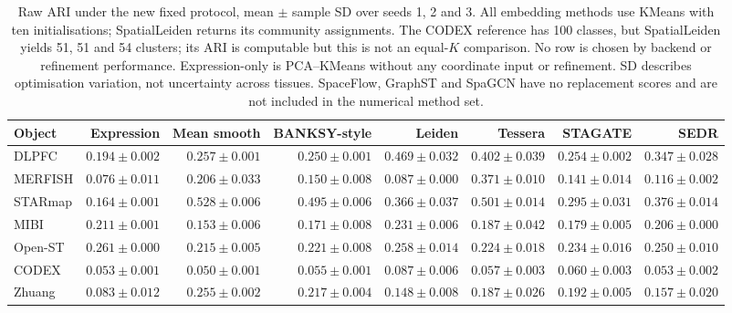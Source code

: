 \begin{table}[!htbp]\centering\footnotesize

\caption{Raw ARI under the new fixed protocol, mean $\pm$ sample SD over seeds 1, 2 and 3. All embedding methods use KMeans with ten initialisations; SpatialLeiden returns its community assignments. The CODEX reference has 100 classes, but SpatialLeiden yields 51, 51 and 54 clusters; its ARI is computable but this is not an equal-$K$ comparison. No row is chosen by backend or refinement performance. Expression-only is PCA--KMeans without any coordinate input or refinement. SD describes optimisation variation, not uncertainty across tissues. SpaceFlow, GraphST and SpaGCN have no replacement scores and are not included in the numerical method set.}

\label{tab:field-ari}

\setlength{\tabcolsep}{3.2pt}\begin{tabular}{lrrrrrrr}\toprule

Object & Expression & Mean smooth & BANKSY-style & Leiden & Tessera & STAGATE & SEDR\\\midrule

DLPFC & $0.194\pm0.002$ & $0.257\pm0.001$ & $0.250\pm0.001$ & $0.469\pm0.032$ & $0.402\pm0.039$ & $0.254\pm0.002$ & $0.347\pm0.028$\\

MERFISH & $0.076\pm0.011$ & $0.206\pm0.033$ & $0.150\pm0.008$ & $0.087\pm0.000$ & $0.371\pm0.010$ & $0.141\pm0.014$ & $0.116\pm0.002$\\

STARmap & $0.164\pm0.001$ & $0.528\pm0.006$ & $0.495\pm0.006$ & $0.366\pm0.037$ & $0.501\pm0.014$ & $0.295\pm0.031$ & $0.376\pm0.014$\\

MIBI & $0.211\pm0.001$ & $0.153\pm0.006$ & $0.171\pm0.008$ & $0.231\pm0.006$ & $0.187\pm0.042$ & $0.179\pm0.005$ & $0.206\pm0.000$\\

Open-ST & $0.261\pm0.000$ & $0.215\pm0.005$ & $0.221\pm0.008$ & $0.258\pm0.014$ & $0.224\pm0.018$ & $0.234\pm0.016$ & $0.250\pm0.010$\\

CODEX & $0.053\pm0.001$ & $0.050\pm0.001$ & $0.055\pm0.001$ & $0.087\pm0.006$ & $0.057\pm0.003$ & $0.060\pm0.003$ & $0.053\pm0.002$\\

Zhuang & $0.083\pm0.012$ & $0.255\pm0.002$ & $0.217\pm0.004$ & $0.148\pm0.008$ & $0.187\pm0.026$ & $0.192\pm0.005$ & $0.157\pm0.020$\\

\bottomrule\end{tabular}\end{table}

